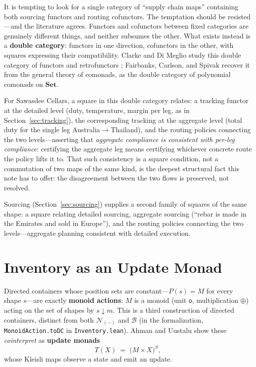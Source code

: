 \documentclass[11pt,a4paper]{article}
\newcommand{\Set}{\mathbf{Set}}
\newcommand{\N}{\mathcal{N}}
\newcommand{\B}{\mathcal{B}}
\newcommand{\dc}{\mathbin{\downarrow}}
\newcommand{\obs}{\mathsf{o}}
\theoremstyle{plain}
\theoremstyle{definition}
\theoremstyle{remark}
\begin{document}
It is tempting to look for a single category of ``supply chain maps''
containing both sourcing functors and routing cofunctors. The
temptation should be resisted---and the literature agrees. Functors
and cofunctors between fixed categories are genuinely different
things, and neither subsumes the other. What exists instead is a
\textbf{double category}: functors in one direction, cofunctors in the
other, with squares expressing their compatibility. Clarke and
Di Meglio study this double category of functors and retrofunctors
\cite{clarke-di-meglio}; Fairbanks, Carlson, and Spivak
\cite{fairbanks-carlson-spivak} recover it from the general theory of
comonads, as the double category of polynomial comonads on $\Set$.

For Sawasdee Cellars, a square in this double category relates: a
tracking functor at the detailed level (duty, temperature, margin per
leg, as in Section~\ref{sec:tracking}), the corresponding tracking at
the aggregate level (total duty for the single leg
Australia${}\to{}$Thailand), and the routing policies connecting the
two levels---asserting that \emph{aggregate compliance is consistent
with per-leg compliance}: certifying the aggregate leg means
certifying whichever concrete route the policy lifts it to. That such
consistency is a square condition, not a commutation of two maps of
the same kind, is the deepest structural fact this note has to offer:
the disagreement between the two flows is preserved, not resolved.

Sourcing (Section~\ref{sec:sourcing}) supplies a second family of
squares of the same shape: a square relating detailed sourcing,
aggregate sourcing (``rebar is made in the Emirates and sold in
Europe''), and the routing policies connecting the two
levels---aggregate planning consistent with detailed execution.

\section{Inventory as an Update Monad}\label{sec:inventory}

Directed containers whose position sets are constant---$P(s) = M$ for
every shape $s$---are exactly \textbf{monoid actions}: $M$ is a monoid
(unit $\obs$, multiplication $\oplus$) acting on the set of shapes by
$s \dc m$. This is a third construction of directed containers,
distinct from both $\N_{(-)}$ and $\B$
(in the formalization, \texttt{MonoidAction.toDC} in
\texttt{Inventory.lean}).
Ahman and Uustalu \cite{ahman-uustalu-update} show these
\emph{cointerpret} as \textbf{update monads}
\[
T(X) \;=\; \bigl( M \times X \bigr)^{S},
\]
whose Kleisli maps observe a state and emit an update.
\end{document}
